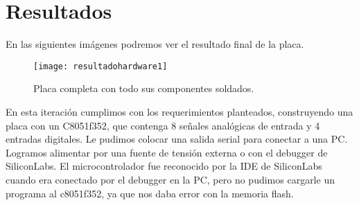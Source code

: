 
\section{Resultados} %
\label{sec:resultados}
En las siguientes imágenes podremos ver el resultado final de la placa.

\begin{figure}[H]
  \centering
  \texttt{[image: resultadohardware1]}
  \caption{Placa completa con todo sus componentes soldados.}\label{fig:resultadohardware1}
\end{figure}

En esta iteración cumplimos con los requerimientos planteados, construyendo una placa con un C8051f352, que contenga 8 señales analógicas de entrada y 4 entradas digitales. Le pudimos colocar una salida serial para conectar a una PC.
Logramos alimentar por una fuente de tensión externa o con el debugger de SiliconLabs. El microcontrolador fue reconocido por la IDE de SiliconLabs cuando era conectado por el debugger en la PC, pero no pudimos cargarle un programa al c8051f352, ya que nos daba error con la memoria flash.

